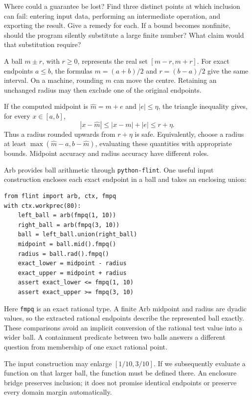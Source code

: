 \begin{question}{Where could a guarantee be lost?}
Find three distinct points at which inclusion can fail: entering input data,
performing an intermediate operation, and exporting the result. Give a remedy
for each. If a bound becomes nonfinite, should the program silently substitute
a large finite number? What claim would that substitution require?
\end{question}

\newpage
{}
A ball $m\pm r$, with $r\ge0$, represents the real set $[m-r,m+r]$.
For exact endpoints $a\le b$, the formulas $m=(a+b)/2$ and $r=(b-a)/2$
give the same interval. On a machine, rounding $m$ can move the centre. Retaining
an unchanged radius may then exclude one of the original endpoints.

If the computed midpoint is $\widehat m=m+e$ and $|e|\le\eta$, the triangle
inequality gives, for every $x\in[a,b]$,
\[
 |x-\widehat m|\le |x-m|+|e|\le r+\eta.
\]
Thus a radius rounded upwards from $r+\eta$ is safe. Equivalently, choose a radius
at least $\max(\widehat m-a,b-\widehat m)$, evaluating these quantities with
appropriate bounds. Midpoint accuracy and radius accuracy have different roles.

Arb provides ball arithmetic through \texttt{python-flint}. One useful input
construction encloses each exact endpoint in a ball and takes an enclosing union:
\begin{lstlisting}
from flint import arb, ctx, fmpq
with ctx.workprec(80):
    left_ball = arb(fmpq(1, 10))
    right_ball = arb(fmpq(3, 10))
    ball = left_ball.union(right_ball)
    midpoint = ball.mid().fmpq()
    radius = ball.rad().fmpq()
    exact_lower = midpoint - radius
    exact_upper = midpoint + radius
    assert exact_lower <= fmpq(1, 10)
    assert exact_upper >= fmpq(3, 10)
\end{lstlisting}
Here \texttt{fmpq} is an exact rational type. A finite Arb midpoint and radius are
dyadic values, so the extracted rational endpoints describe the represented ball
exactly. These comparisons avoid an implicit conversion of the rational test
value into a wider ball. A containment predicate between two balls answers a
different question from membership of one exact rational point.

The input construction may enlarge $[1/10,3/10]$. If we subsequently evaluate a
function on that larger ball, the function must be defined there. An enclosure
bridge preserves inclusion; it does not promise identical endpoints or preserve
every domain margin automatically.

